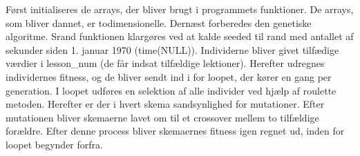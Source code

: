 Først initialiseres de arrays, der bliver brugt i programmets funktioner. De arrays, som bliver dannet, er todimensionelle.
Dernæst forberedes den genetiske algoritme. Srand funktionen klargøres ved at kalde seeded til rand med antallet af sekunder siden 1. januar 1970 (time(NULL)). Individerne bliver givet tilfædige værdier i lesson\_num (de får indsat tilfældige lektioner). Herefter udregnes individernes fitness, og de bliver sendt ind i for loopet, der kører en gang per generation. I loopet udføres en selektion af alle individer ved hjælp af roulette metoden. Herefter er der i hvert skema sandsynlighed for mutationer. Efter mutationen bliver skemaerne lavet om til et crossover mellem to tilfældige forældre. Efter denne process bliver skemaernes fitness igen regnet ud, inden for loopet begynder forfra.